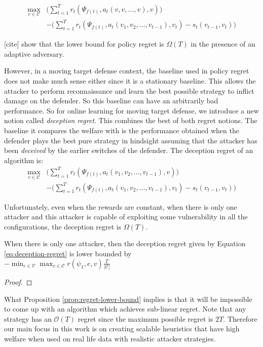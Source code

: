 \documentclass[sigconf]{aamas}  %
\newcommand{\cal}[1]{\mathcal{#1}}
\theoremstyle{definition}
\theoremstyle{definition}
\begin{document}
\begin{align*}
    \max_{v \in \cal C} & \bigg (\sum_{t=1}^T r_t(\Psi_{f(t)}, a_t(v, v, \dots, v), v) \bigg ) \\
    & - \bigg ( \sum_{t=1}^T r_t(\Psi_{f(t)}, a_t(v_1, v_2, \dots, v_{t-1}), v_t) - s_t(v_{t-1}, v_t) \bigg ) 
\end{align*}

[cite] show that the lower bound for policy regret is $\Omega (T)$ in the presence of an adaptive adversary. 

However, in a moving target defense context, the baseline used in policy regret does not make much sense either since it is a stationary baseline. This allows the attacker to perform reconnaissance and learn the best possible strategy to inflict damage on the defender. So this baseline can have an arbitrarily bad performance. So for online learning for moving target defense, we introduce a new notion called {\em deception regret}. This combines the best of both regret notions. The baseline it compares the welfare with is the performance obtained when the defender plays the best pure strategy in hindsight assuming that the attacker has been {\em deceived} by the earlier switches of the defender. The deception regret of an algorithm is:
\begin{align}
    \max_{v \in \cal C} & \bigg (\sum_{t=1}^T r_t(\Psi_{f(t)}, a_t(v_1, v_2, \dots, v_{t-1}), v) \bigg ) \\
    & - \bigg ( \sum_{t=1}^T r_t(\Psi_{f(t)}, a_t(v_1, v_2, \dots, v_{t-1}), v_t) - s_t(v_{t-1}, v_t) \bigg ) \label{eq:deception-regret}
\end{align}

Unfortunately, even when the rewards are constant, when there is only one attacker and this attacker is capable of exploiting some vulnerability in all the configurations, the deception regret is $\Omega (T)$.

\begin{proposition}\label{prop:regret-lower-bound}
When there is only one attacker, then the deception regret given by Equation \eqref{eq:deception-regret} is lower bounded by \\ $-\min_{e \in \cal V}\max_{v \in \cal C} r(\psi_1, e, v) \frac{T}{|\cal C|}$
\end{proposition}
\begin{proof}

\end{proof}

What Proposition \ref{prop:regret-lower-bound} implies is that it will be impossible to come up with an algorithm which achieves sub-linear regret. Note that any strategy has an $\cal O(T)$ regret since the maximum possible regret is $2T$. Therefore our main focus in this work is on creating scalable heuristics that have high welfare when used on real life data with realistic attacker strategies.
\end{document}
